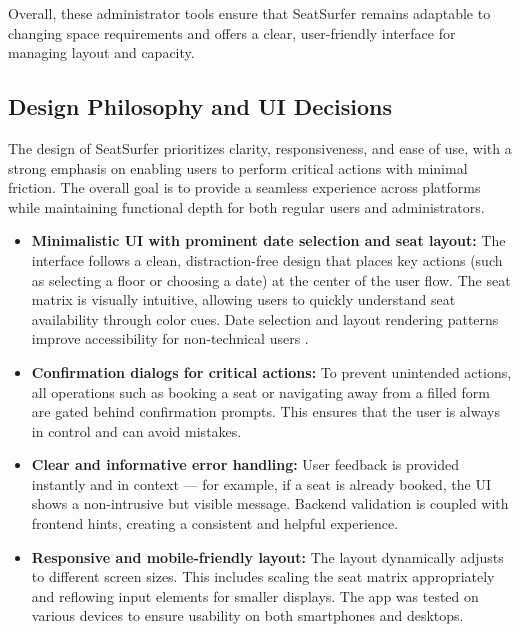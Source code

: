 \documentclass[12pt,a4paper]{report} %
\begin{document}
Overall, these administrator tools ensure that SeatSurfer remains adaptable to changing space requirements and offers a clear, user-friendly interface for managing layout and capacity.

\subsection{Design Philosophy and UI Decisions}

The design of SeatSurfer prioritizes clarity, responsiveness, and ease of use, with a strong emphasis on enabling users to perform critical actions with minimal friction. The overall goal is to provide a seamless experience across platforms while maintaining functional depth for both regular users and administrators.

\begin{itemize}
    \item \textbf{Minimalistic UI with prominent date selection and seat layout:}  
    The interface follows a clean, distraction-free design that places key actions (such as selecting a floor or choosing a date) at the center of the user flow. The seat matrix is visually intuitive, allowing users to quickly understand seat availability through color cues. Date selection and layout rendering patterns improve accessibility for non-technical users \cite{santos2022uxpatterns}.

    \item \textbf{Confirmation dialogs for critical actions:}  
    To prevent unintended actions, all operations such as booking a seat or navigating away from a filled form are gated behind confirmation prompts. This ensures that the user is always in control and can avoid mistakes.

    \item \textbf{Clear and informative error handling:}  
    User feedback is provided instantly and in context — for example, if a seat is already booked, the UI shows a non-intrusive but visible message. Backend validation is coupled with frontend hints, creating a consistent and helpful experience.

    \item \textbf{Responsive and mobile-friendly layout:}  
    The layout dynamically adjusts to different screen sizes. This includes scaling the seat matrix appropriately and reflowing input elements for smaller displays. The app was tested on various devices to ensure usability on both smartphones and desktops.
\end{itemize}
\end{document}
